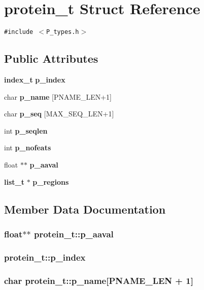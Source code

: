 \section{protein\_\-t  Struct Reference}
\label{structprotein__t}
{\tt \#include $<$P\_\-types.h$>$}

\subsection*{Public Attributes}
\begin{CompactItemize}
\item 
{\bf index\_\-t} {\bf p\_\-index}
\item 
char {\bf p\_\-name} [PNAME\_\-LEN+1]
\item 
char {\bf p\_\-seq} [MAX\_\-SEQ\_\-LEN+1]
\item 
int {\bf p\_\-seqlen}
\item 
int {\bf p\_\-nofeats}
\item 
float $\ast$$\ast$ {\bf p\_\-aaval}
\item 
{\bf list\_\-t} $\ast$ {\bf p\_\-regions}
\end{CompactItemize}


\subsection{Member Data Documentation}
\subsubsection{\setlength{\rightskip}{0pt plus 5cm}float$\ast$$\ast$ protein\_\-t::p\_\-aaval}\label{structprotein__t_m5}


\subsubsection{ protein\_\-t::p\_\-index}\label{structprotein__t_m0}


\subsubsection{\setlength{\rightskip}{0pt plus 5cm}char protein\_\-t::p\_\-name[PNAME\_\-LEN + 1]}\label{structprotein__t_m1}


